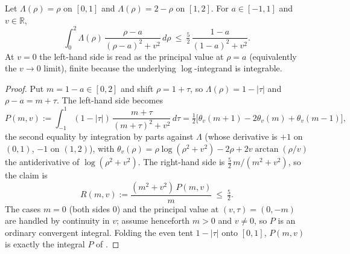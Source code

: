 \begin{lemma}
\label{lem:lb_booker_single}
\leanok
{}
Let $\Lambda(\rho)=\rho$ on $[0,1]$ and $\Lambda(\rho)=2-\rho$ on $[1,2]$. For
$a\in[-1,1]$ and $v\in\mathbb R$,
\[
  \int_0^2 \Lambda(\rho)\,\frac{\rho-a}{(\rho-a)^2+v^2}\,d\rho
  \ \le\ \tfrac52\,\frac{1-a}{(1-a)^2+v^2}.
\]
At $v=0$ the left-hand side is read as the principal value at $\rho=a$ (equivalently
the $v\to0$ limit), finite because the underlying $\log$-integrand is integrable.
\end{lemma}

\begin{proof}
\leanok
{}
Put $m=1-a\in[0,2]$ and shift $\rho=1+\tau$, so $\Lambda(\rho)=1-|\tau|$ and
$\rho-a=m+\tau$. The left-hand side becomes
\[
  P(m,v):=\int_{-1}^{1}(1-|\tau|)\,\frac{m+\tau}{(m+\tau)^2+v^2}\,d\tau
        =\tfrac12\bigl[\theta_v(m+1)-2\theta_v(m)+\theta_v(m-1)\bigr],
\]
the second equality by integration by parts against $\Lambda$ (whose derivative
is $+1$ on $(0,1)$, $-1$ on $(1,2)$), with
$\theta_v(\rho)=\rho\log(\rho^2+v^2)-2\rho+2v\arctan(\rho/v)$ the antiderivative
of $\log(\rho^2+v^2)$. The right-hand side is $\tfrac52\,m/(m^2+v^2)$, so the
claim is
\[
  R(m,v):=\frac{(m^2+v^2)\,P(m,v)}{m}\ \le\ \tfrac52 .
\]
The cases $m=0$ (both sides $0$) and the principal value at $(v,\tau)=(0,-m)$ are
handled by continuity in $v$; assume henceforth $m>0$ and $v\neq0$, so $P$ is an
ordinary convergent integral. Folding the even tent $1-|\tau|$ onto $[0,1]$,
$P(m,v)$ is exactly the integral $P$ of .


\end{proof}
